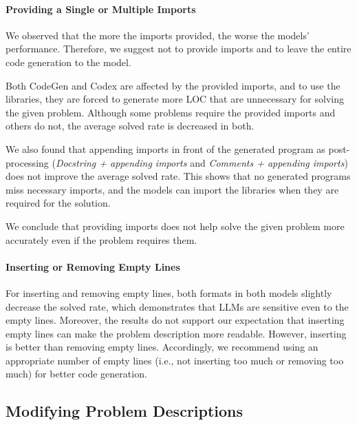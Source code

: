 \documentclass{article}
\begin{document}
\paragraph{Providing a Single or Multiple Imports}

We observed that the more the imports provided, the worse the models' performance.
Therefore, we suggest not to provide imports and to leave the entire code generation to the model.

Both CodeGen and Codex are affected by the provided imports, and to use the libraries, they are forced to generate more LOC that are unnecessary for solving the given problem.
Although some problems require the provided imports and others do not, the average solved rate is decreased in both.

We also found that appending imports in front of the generated program as post-processing (\textit{Docstring + appending imports} and \textit{Comments + appending imports}) does not improve the average solved rate.
This shows that no generated programs miss necessary imports, and the models can import the libraries when they are required for the solution.

We conclude that providing imports does not help solve the given problem more accurately even if the problem requires them.



\paragraph{Inserting or Removing Empty Lines}

For inserting and removing empty lines, both formats in both models slightly decrease the solved rate, which demonstrates that LLMs are sensitive even to the empty lines.
Moreover, the results do not support our expectation that inserting empty lines can make the problem description more readable.
However, inserting is better than removing empty lines.
Accordingly, we recommend using an appropriate number of empty lines (i.e., not inserting too much or removing too much) for better code generation.








\subsection{Modifying Problem Descriptions}
\label{sec:results:modification}
\end{document}
